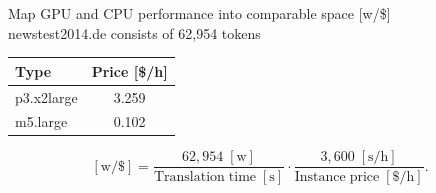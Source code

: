\documentclass[aspectratio=169]{beamer}					%
\begin{document}
\begin{frame}{}

\centering
Map GPU and CPU performance into comparable space [w/\$] \\[5mm]

newstest2014.de consists of 62,954 tokens
\vspace{0.5cm}

\begin{table}
\begin{tabular}{lc} \toprule
Type & Price [\$/h] \\ \midrule
p3.x2large & 3.259 \\
m5.large & 0.102 \\ \bottomrule
\end{tabular}
\end{table}\vspace{0.5cm}

$$ [\mathrm{w}/\$] = \frac{62,954\;\mathrm{[w]}}{\mathrm{Translation\;time\;[s]}} \cdot \frac{3,600\;\mathrm{\left[s/h\right]}}{\mathrm{Instance\; price\;\left[\$/h\right]}}. $$

\end{frame}
\end{document}
